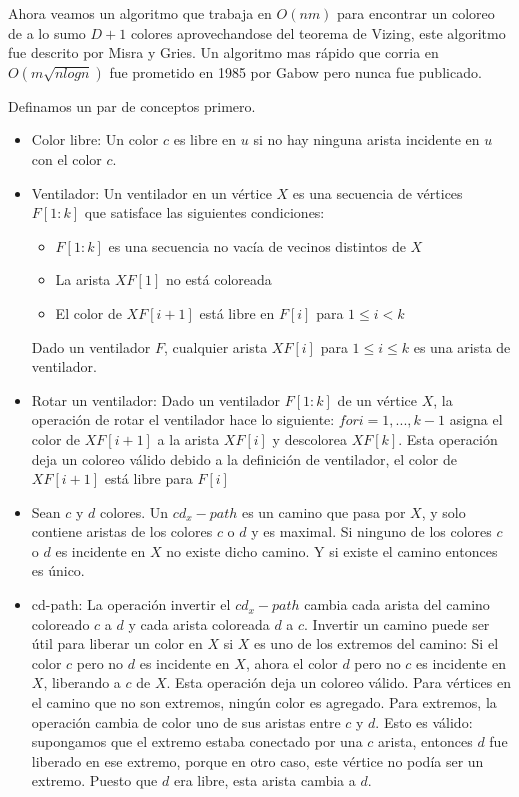 \documentclass[a4paper]{article}
\begin{document}
Ahora veamos un algoritmo que trabaja en $O(nm)$ para encontrar un coloreo de a lo sumo $D+1$ colores aprovechandose del teorema de Vizing, este algoritmo fue descrito por Misra y Gries. Un algoritmo mas r\'apido que
corria en $O(m\sqrt{nlogn})$ fue prometido en 1985 por Gabow pero nunca fue publicado.

Definamos un par de conceptos primero.

\begin{itemize}
    \item Color libre: Un color $c$ es libre en $u$ si no hay ninguna arista incidente en $u$ con el color $c$.
    \item Ventilador: Un ventilador en un v\'ertice $X$ es una secuencia de v\'ertices $F[1:k]$ que satisface las siguientes condiciones:
        \begin{itemize}
            \item $F[1:k]$ es una secuencia no vac\'ia de vecinos distintos de $X$
            \item La arista $XF[1]$ no est\'a coloreada
            \item El color de $XF[i+1]$ est\'a libre en $F[i]$ para $1 \leq i < k$
        \end{itemize}
        Dado un ventilador $F$, cualquier arista $XF[i]$ para $1 \leq i \leq k$ es una arista de ventilador.
    \item Rotar un ventilador: Dado un ventilador $F[1:k]$ de un v\'ertice $X$, la operaci\'on de rotar el ventilador hace lo siguiente: $for i=1,...,k-1$ asigna el color de $XF[i+1]$ a la arista $XF[i]$ y descolorea $XF[k]$. Esta operaci\'on deja un coloreo v\'alido debido a la definici\'on de ventilador, el color de $XF[i+1]$ est\'a libre para $F[i]$
    \item Sean $c$ y $d$ colores. Un $cd_x-path$ es un camino que pasa por $X$, y solo contiene aristas de los colores $c$ o $d$ y es maximal. Si ninguno de los colores $c$ o $d$ es incidente en $X$ no existe dicho camino. Y si existe el camino entonces es \'unico.
    \item cd-path: La operaci\'on invertir el $cd_x-path$ cambia cada arista del camino coloreado $c$ a $d$ y cada arista coloreada $d$ a $c$. Invertir un camino puede ser \'util para liberar un color en $X$ si $X$ es uno de los extremos del camino: Si el color $c$ pero no $d$ es incidente en $X$, ahora el color $d$ pero no $c$ es incidente en $X$, liberando a $c$ de $X$. Esta operaci\'on deja un coloreo v\'alido. Para v\'ertices en el camino que no son extremos, ning\'un color es agregado. Para extremos, la operaci\'on cambia de color uno de sus aristas entre $c$ y $d$. Esto es v\'alido: supongamos que el extremo estaba conectado por una $c$ arista, entonces $d$ fue liberado en ese extremo, porque en otro caso, este v\'ertice no pod\'ia ser un extremo. Puesto que $d$ era libre, esta arista cambia a $d$.
\end{itemize}
\end{document}
